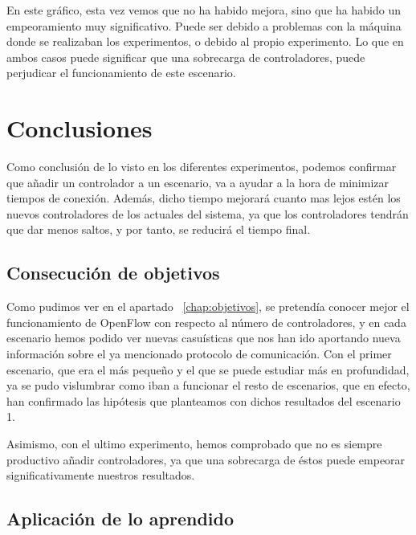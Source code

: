\documentclass[a4paper, 12pt]{book}
\begin{document}
	En este gráfico, esta vez vemos que no ha habido mejora, sino que ha habido un empeoramiento muy  significativo. Puede ser debido a problemas con la máquina donde se realizaban los experimentos, o debido al propio experimento. Lo que en ambos casos puede significar que una sobrecarga de controladores, puede perjudicar el funcionamiento de este escenario.
	
	
	\clearpage
	\chapter{Conclusiones}
	\label{chap:conclusiones}
	
	Como conclusión de lo visto en los diferentes experimentos, podemos confirmar que añadir un controlador a un escenario, va a ayudar a la hora de minimizar tiempos de conexión. Además, dicho tiempo mejorará cuanto mas lejos estén los nuevos controladores de los actuales del sistema, ya que los controladores tendrán que dar menos saltos, y por tanto, se reducirá el tiempo final. 
	
	\section{Consecución de objetivos}
	\label{sec:consecucion-objetivos}
	
	Como pudimos ver en el apartado ~\ref{chap:objetivos}, se pretendía conocer mejor el funcionamiento de OpenFlow con respecto al número de controladores, y en cada escenario hemos podido ver nuevas casuísticas que nos han ido aportando nueva información sobre el ya mencionado protocolo de comunicación. Con el primer escenario, que era el más pequeño y el que se puede estudiar más en profundidad, ya se pudo vislumbrar como iban a funcionar el resto de escenarios, que en efecto, han confirmado las hipótesis que planteamos con dichos resultados del escenario 1.
	
	Asimismo, con el ultimo experimento, hemos comprobado que no es siempre productivo añadir controladores, ya que una sobrecarga de éstos puede empeorar significativamente nuestros resultados.
	
	\section{Aplicación de lo aprendido}
	\label{sec:aplicacion}
	
\end{document}
